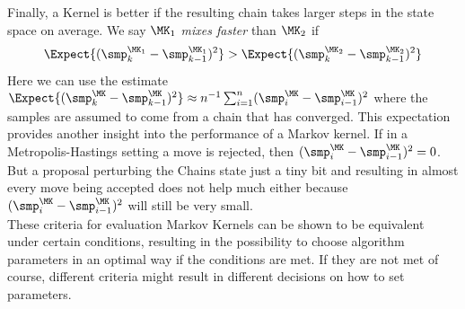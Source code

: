 Finally, a Kernel is better if the resulting chain takes larger steps in the state space on average. We say $\MK_1$ \emph{mixes faster} than $\MK_2$ if
$$ \Expect\{(\smp^{\MK_1}_k - \smp^{\MK_1}_{k-1})^2\} > \Expect\{(\smp^{\MK_2}_k - \smp^{\MK_2}_{k-1})^2\}$$
Here we can use the estimate $\Expect\{(\smp^{\MK}_k - \smp^{\MK}_{k-1})^2\} \approx n^{-1} \sum_{i=1}^n (\smp^{\MK}_i - \smp^{\MK}_{i-1})^2 $ where the samples are assumed to come from a chain that has converged. This expectation provides another insight into the performance of a Markov kernel. If in a Metropolis-Hastings setting a move is rejected, then $(\smp^{\MK}_i - \smp^{\MK}_{i-1})^2 = 0$. But a proposal perturbing the Chains state just a tiny bit and resulting in almost every move being accepted does not help much either because $(\smp^{\MK}_i - \smp^{\MK}_{i-1})^2$ will still be very small.\\
These criteria for evaluation Markov Kernels can be shown to be equivalent under certain conditions, resulting in the possibility to choose algorithm parameters in an optimal way if the conditions are met. If they are not met of course, different criteria might result in different decisions on how to set parameters.


